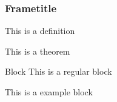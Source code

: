 \documentclass[pdf,10pt,unicode]{beamer}
\begin{document}
\begin{frame}
\frametitle{Frametitle}
\begin{definition}
This is a definition
\end{definition}

\begin{theorem}
This is a theorem
\end{theorem}

\begin{block}{Block}
This is a regular block
\end{block}

\begin{example}
This is a example block
\end{example}
\end{frame}
\end{document}
